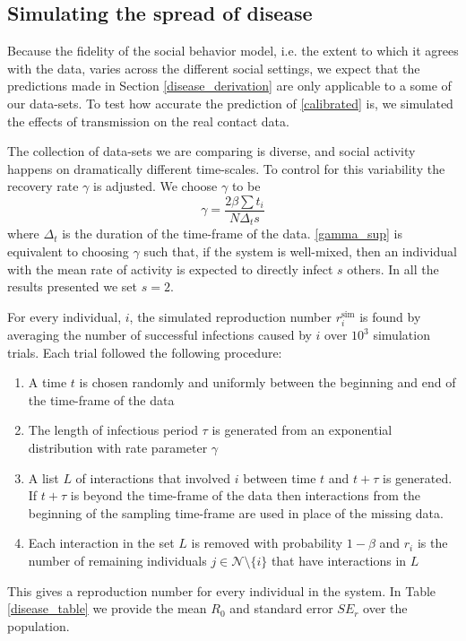 \documentclass[twocolumn,8pt]{article}
\begin{document}
\subsection{Simulating the spread of disease}
\label{simulation}
Because the fidelity of the social behavior model, i.e. the extent to which it agrees with the data, varies across the different social settings, we expect that the predictions made in Section \ref{disease_derivation} are only applicable to a some of our data-sets. To test how accurate the prediction of \eqref{calibrated} is, we simulated the effects of transmission on the real contact data.

The collection of data-sets we are comparing is diverse, and social activity happens on dramatically different time-scales. To control for this variability the recovery rate $\gamma$ is adjusted. We choose $\gamma$ to be  
\begin{equation}
\label{gamma_sup}
\gamma=\frac{2\beta\sum t_{i}}{N \Delta_{t} s}
\end{equation}
where $\Delta_{t}$ is the duration of the time-frame of the data. \eqref{gamma_sup} is equivalent to choosing $\gamma$ such that, if the system is well-mixed, then an individual with the mean rate of activity is expected to directly infect $s$ others. In all the results presented we set $s=2$.

For every individual, $i$, the simulated reproduction number $r_{i}^{\text{sim}}$ is found by averaging the number of successful infections caused by $i$ over $10^{3}$ simulation trials. Each trial followed the following procedure:
\begin{enumerate}
\item A time $t$ is chosen randomly and uniformly between the beginning and end of the time-frame of the data
\item The length of infectious period $\tau$ is generated from an exponential distribution with rate parameter $\gamma$
\item A list $L$ of interactions that involved $i$ between time $t$ and $t+\tau$ is generated. If $t+\tau$ is beyond the time-frame of the data then interactions from the beginning of the sampling time-frame are used in place of the missing data. 
\item Each interaction in the set $L$ is removed with probability $1-\beta$ and $r_{i}$ is the number of remaining individuals $j\in\mathcal{N}\setminus\{i\}$ that have interactions in $L$ 
\end{enumerate}
This gives a reproduction number for every individual in the system. In Table \ref{disease_table} we provide the mean $R_{0}$ and standard error $SE_{r}$ over the population. 
\end{document}
